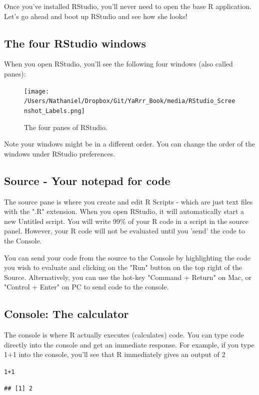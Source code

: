 \documentclass{tufte-book}\usepackage[]{graphicx}\usepackage[]{color}
\makeatletter
\newcommand{\hlnum}[1]{\textcolor[rgb]{0.686,0.059,0.569}{#1}}%
\newcommand{\hlopt}[1]{\textcolor[rgb]{0,0,0}{#1}}%
\newenvironment{kframe}{%
 \def\at@end@of@kframe{}%
 \ifinner\ifhmode%
  \def\at@end@of@kframe{\end{minipage}}%
  \begin{minipage}{\columnwidth}%
 \fi\fi%
 \def\FrameCommand##1{\hskip\@totalleftmargin \hskip-\fboxsep
 \colorbox{shadecolor}{##1}\hskip-\fboxsep
     \hskip-\linewidth \hskip-\@totalleftmargin \hskip\columnwidth}%
 \MakeFramed {\advance\hsize-\width
   \@totalleftmargin\z@ \linewidth\hsize
   \@setminipage}}%
 {\par\unskip\endMakeFramed%
 \at@end@of@kframe}
\newenvironment{knitrout}{}{} %
\makeatother
\begin{document}
Once you've installed RStudio, you'll never need to open the base R application. Let's go ahead and boot up RStudio and see how she looks!

\subsection{The four RStudio windows}

When you open RStudio, you'll see the following four windows (also called panes):

\begin{figure}[h]
\texttt{[image: /Users/Nathaniel/Dropbox/Git/YaRrr\_Book/media/RStudio\_Screenshot\_Labels.png]}
\caption{The four panes of RStudio.}
\label{fig:fullfig}
\end{figure}

Note your windows might be in a different order. You can change the order of the windows under RStudio preferences.

\subsection{Source - Your notepad for code}

The source pane is where you create and edit R Scripts - which are just text files with the ".R" extension. When you open RStudio, it will automatically start a new Untitled script. You will write 99\% of your R code in a script in the source panel. However, your R code will not be evaluated until you 'send' the code to the Console.

You can send your code from the source to the Console by highlighting the code you wish to evaluate and clicking on the "Run" button on the top right of the Source. Alternatively, you can use the hot-key "Command + Return" on Mac, or "Control + Enter" on PC to send code to the console.



\subsection{Console: The calculator}

The console is where R actually executes (calculates) code. You can type code directly into the console and get an immediate response. For example, if you type 1+1 into the console, you'll see that R immediately gives an output of 2

\begin{footnotesize}
\begin{knitrout}
\color{fgcolor}\begin{kframe}
\begin{alltt}
\hlnum{1}\hlopt{+}\hlnum{1}
\end{alltt}
\begin{verbatim}
## [1] 2
\end{verbatim}
\end{kframe}
\end{knitrout}
\end{footnotesize}
\end{document}
